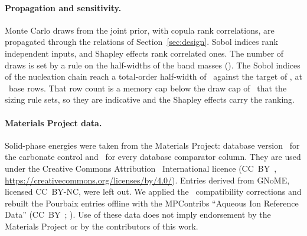 \paragraph*{Propagation and sensitivity.}
Monte Carlo draws from the joint prior, with copula rank correlations, are propagated through the relations of Section~\ref{sec:design}. %
Sobol indices rank independent inputs\cite{saltelli2002making,archer1997sensitivity}, and Shapley effects rank correlated ones\cite{iooss2019shapley}. %
The number of draws is set by a rule on the half-widths of the band masses (). %
The Sobol indices of the nucleation chain reach a total-order half-width of \NumSobolNucHalfWidth\ against the target of \NumSobolNucTarget, at \NumSobolNucBase\ base rows. %
That row count is a memory cap below the draw cap of \NumSizingDrawCap\ that the sizing rule sets, so they are indicative and the Shapley effects carry the ranking. %

\paragraph*{Materials Project data.}
Solid-phase energies were taken from the Materials Project\cite{jain2013commentary}: database version \NumMpDatabaseVersion\ for the carbonate control and \NumMpDatabaseVersionComparator\ for every database comparator column. %
They are used under the Creative Commons Attribution \NumMpLicenceVersion\ International licence (CC~BY~\NumMpLicenceVersion, \url{https://creativecommons.org/licenses/by/4.0/}). %
Entries derived from GNoME, licensed CC~BY-NC, were left out. %
We applied the \NumMpCorrectionScheme\ compatibility corrections and rebuilt the Pourbaix entries offline with the MPContribs ``Aqueous Ion Reference Data'' (CC~BY~\NumMpLicenceVersion; ). %
Use of these data does not imply endorsement by the Materials Project or by the contributors of this work. %

